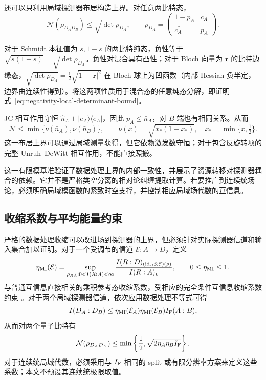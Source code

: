 \documentclass[UTF8,11pt,a4paper,fontset=none]{ctexart}
\begin{document}
还可以只利用局域探测器布居构造上界。对任意两比特态，
\begin{equation}
\mathcal N(\rho_{D_AD_B})\leq\sqrt{\det\rho_{D_A}},
\qquad
\rho_{D_A}=
\begin{pmatrix}1-p_A&c_A\\c_A^*&p_A\end{pmatrix}.
\label{eq:negativity-local-determinant-bound}
\end{equation}

对于 Schmidt 本征值为 $s,1-s$ 的两比特纯态，负性等于 $\sqrt{s(1-s)}=\sqrt{\det\rho_{D_A}}$。负性对混合具有凸性；对于 Bloch 向量为 $\boldsymbol r$ 的比特边缘态，$\sqrt{\det\rho_{D_A}}=\tfrac12\sqrt{1-|\boldsymbol r|^2}$ 在 Bloch 球上为凹函数（内部 Hessian 负半定，边界由连续性得到）。将这两项性质用于混合态的任意纯态分解，即证明式~\eqref{eq:negativity-local-determinant-bound}。

JC 相互作用守恒 $\hat n_A+|e_A\rangle\langle e_A|$，因此 $p_A\leq\bar n_A$，对 $B$ 端也有相同关系。从而
\begin{equation}
\mathcal N\leq
\min\{\nu(\bar n_A),\nu(\bar n_B)\},
\qquad
\nu(x)=\sqrt{x_*(1-x_*)},\quad x_*=\min\{x,\tfrac12\}.
\label{eq:mean-energy-negativity-bound}
\end{equation}
这一布居上界可以通过局域测量获得，但它依赖激发数守恒；对于包含反旋转项的完整 Unruh--DeWitt 相互作用，不能直接照搬。

这一有限模基准验证了数据处理上界的内部一致性，并展示了资源转移对探测器耦合的依赖。它并不是严格类空分离的相对论纠缠提取计算。若要推广到连续统场论，必须明确局域模函数的紧致时空支撑，并控制相应局域场代数的互信息。




\subsection{收缩系数与平均能量约束}
严格的数据处理收缩可以改进场到探测器的上界，但必须针对实际探测器信道和输入集合加以证明。对于一个受调节的信道 $\mathcal E:A\to D$，定义
\begin{equation}
\eta_{\rm MI}(\mathcal E)=
\sup_{\rho_{RA}:0<I(R:A)<\infty}
\frac{I(R:D)_{(\mathrm{id}_R\otimes\mathcal E)(\rho)}}{I(R:A)_\rho},
\qquad 0\leq\eta_{\rm MI}\leq1.
\label{eq:mi-contraction-coefficient}
\end{equation}
与普通互信息直接相关的乘积参考态收缩系数，受相应的完全条件互信息收缩系数约束 \cite{HircheGeorgeNuradhaWilde2026Conditional}。对于两个局域探测器信道，依次应用数据处理不等式可得
\begin{equation}
I(D_A:D_B)\leq
\eta_{\rm MI}(\mathcal E_A)\eta_{\rm MI}(\mathcal E_B)I_{\rm F}(A:B),
\label{eq:supp-product-mi-contraction}
\end{equation}
从而对两个量子比特有
\begin{equation}
\mathcal N(\rho_{D_AD_B})\leq
\min\left\{\frac12,\sqrt{2\eta_A\eta_B I_{\rm F}}\right\}.
\label{eq:channel-sensitive-negativity-bound}
\end{equation}
对于连续统局域代数，必须采用与 $I_{\rm F}$ 相同的 split 或有限分辨率方案来定义这些系数；本文不预设其连续统极限取值。
\end{document}
